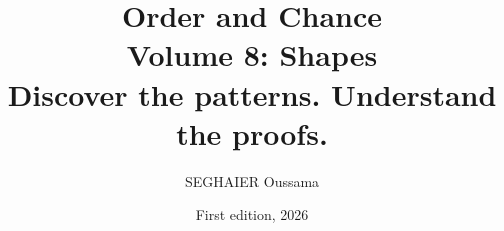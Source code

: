 \documentclass[11pt,openany]{book}
\title{\Huge\textbf{Order and Chance}\\[0.4em]\LARGE Volume 8: Shapes\\[0.6em]
\Large Discover the patterns. Understand the proofs.}
\author{SEGHAIER Oussama}
\date{First edition, 2026}
\begin{document}
\frontmatter
\makecover
\maketitle

\tableofcontents

\mainmatter












\appendix












\end{document}
